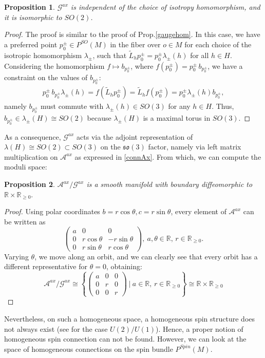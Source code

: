 \documentclass{article}
\numberwithin{equation}{section}
\newtheorem{proposition}{Proposition}[section]
\theoremstyle{definition}
\newcommand{\R}{\mathbb{R}}
\newcommand{\A}{\mathcal{A}}
\newcommand{\so}[1]{\mathfrak{so}(#1)}
\newcommand{\OF}[1]{P^{SO}(#1)}
\newcommand{\SP}[1]{P^{Spin}(#1)}
\begin{document}
\begin{proposition}
\label{gaugeax}
    $\mathcal{G}^{ax}$ is independent of the choice of isotropy homomorphism, and it is isomorphic to $SO(2)$.
\end{proposition}
\begin{proof}
    The proof is similar to the proof of Prop.\ref{gaugehom}. In this case, we have a preferred point $p_0^{\pm}\in\OF{M}$ in the fiber over $o\in M$ for each choice of the isotropic homomorphism $\lambda_{\pm}$, such that $\tilde{L}_hp_0^{\pm}=p_0^{\pm}\lambda_{\pm}(h)$ for all $h\in H$. Considering the homomorphism $f\mapsto b_{p_0^{\pm}}$, where $f(p_0^{\pm})=p_0^{\pm}\,b_{p_0^{\pm}}$, we have a constraint on the values of $b_{p_0^{\pm}}$:
    \begin{align*}
        p_0^{\pm}\, b_{p_0^{\pm}}\lambda_{\pm}(h)=f(\tilde L_h p_0^{\pm})=\tilde L_h f(p_0^{\pm})=p_0^{\pm} \lambda_{\pm}(h)b_{p_0^{\pm}},
    \end{align*}
    namely $b_{p_0^{\pm}}$ must commute with $\lambda_{\pm}(h)\in SO(3)$ for any $h\in H$. Thus, $b_{p_0^{\pm}}\in \lambda_{\pm}(H)\cong SO(2)$ because $\lambda_{\pm}(H)$ is a maximal torus in $SO(3)$.
\end{proof}
As a consequence, $\mathcal{G}^{ax}$ acts via the adjoint representation of $\lambda(H)\cong SO(2)\subset SO(3)$ on the $\so{3}$ factor, namely via left matrix multiplication on $\A^{ax}$ as expressed in \eqref{connAx}. From which, we can compute the moduli space:
\begin{proposition}
    $\A^{ax}/\mathcal{G}^{ax}$ is a smooth manifold with boundary diffeomorphic to $\R\times\R_{\geq0}.$
\end{proposition}
\begin{proof}
    Using polar coordinates $b=r\cos{\theta},c=r\sin{\theta}$, every element of $\A^{ax}$ can be written as 
    \[\begin{pmatrix}
        a & 0 & 0\\
        0 & r\cos{\theta} & -r\sin{\theta}\\
        0 & r\sin{\theta} & r\cos{\theta}
    \end{pmatrix},\ a,\theta\in \R,\,r\in\R_{\geq 0}.\]
    Varying $\theta$, we move along an orbit, and we can clearly see that every orbit has a different representative for $\theta=0$, obtaining:
    \[\A^{ax}/\mathcal{G}^{ax}\cong \left\{\begin{pmatrix}
        a & 0 & 0\\
        0 & r & 0\\
        0 & 0 & r
    \end{pmatrix}\ |\ a\in\R,\,r\in\R_{\geq 0} \right\}\cong \R\times \R_{\geq 0}\]
\end{proof}
Nevertheless, on such a homogeneous space, a homogeneous spin structure does not always exist (see \cite{Lawn_2022} for the case $U(2)/U(1)$). Hence, a proper notion of homogeneous spin connection can not be found. However, we can look at the space of homogeneous connections on the spin bundle $\SP{M}$.
\end{document}
